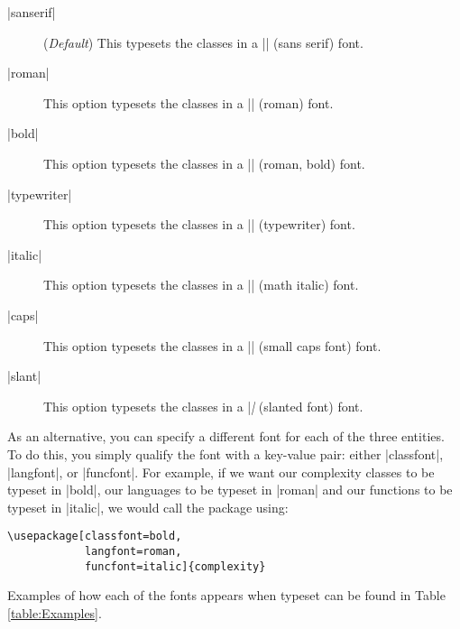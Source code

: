 \documentclass{ltxdoc}
\begin{document}
\begin{description}

  \item[|sanserif|]  (\emph{Default}) This typesets the classes in a
  |\mathsf| (sans serif) font.

  \item[|roman|]  This option typesets the classes in a |\mathrm| (roman)
  font.

  \item[|bold|]   This option typesets the classes in a |\mathbf|
  (roman, bold) font.

  \item[|typewriter|]   This option typesets the classes in a |\mathtt|
  (typewriter) font.

  \item[|italic|]   This option typesets the classes in a |\mathit|
  (math italic) font.

  \item[|caps|]   This option typesets the classes in a |\textsc|
  (small caps font) font.

  \item[|slant|]   This option typesets the classes in a |\textsl|
  (slanted font) font.

\end{description}

As an alternative, you can specify a different font for each of the
three entities.  To do this, you simply qualify the font with a
key-value pair: either |classfont|, |langfont|, or |funcfont|.  For
example, if we want our complexity classes to be typeset in |bold|,
our languages to be typeset in |roman| and our functions to be
typeset in |italic|, we would call the package using:

\begin{verbatim}
\usepackage[classfont=bold,
            langfont=roman,
            funcfont=italic]{complexity}
\end{verbatim}

Examples of how each of the fonts appears when typeset can be found
in Table \ref{table:Examples}.
\end{document}
